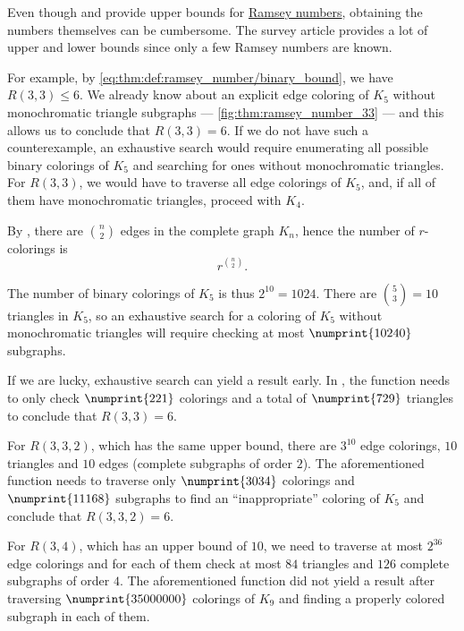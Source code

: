 \begin{remark}\label{rem:estimating_ramsey_numbers}
  Even though  and  provide upper bounds for \hyperref[def:ramsey_number]{Ramsey numbers}, obtaining the numbers themselves can be cumbersome. The survey article \cite{Radziszowski2021} provides a lot of upper and lower bounds since only a few Ramsey numbers are known.

  For example, by \eqref{eq:thm:def:ramsey_number/binary_bound}, we have \( R(3, 3) \leq 6 \). We already know about an explicit edge coloring of \( K_5 \) without monochromatic triangle subgraphs --- \cref{fig:thm:ramsey_number_33} --- and this allows us to conclude that \( R(3, 3) = 6 \). If we do not have such a counterexample, an exhaustive search would require enumerating all possible binary colorings of \( K_5 \) and searching for ones without monochromatic triangles. For \( R(3, 3) \), we would have to traverse all edge colorings of \( K_5 \), and, if all of them have monochromatic triangles, proceed with \( K_4 \).

  By , there are \( \binom n 2 \) edges in the complete graph \( K_n \), hence the number of \( r \)-colorings is
  \begin{equation*}
    r^{\binom n 2}.
  \end{equation*}

  The number of binary colorings of \( K_5 \) is thus \( 2^{10} = 1024 \). There are \( \binom 5 3 = 10 \) triangles in \( K_5 \), so an exhaustive search for a coloring of \( K_5 \) without monochromatic triangles will require checking at most \( \numprint{10 240} \) subgraphs.

  If we are lucky, exhaustive search can yield a result early. In \cite{code}, the function  needs to only check \( \numprint{221} \) colorings and a total of \( \numprint{729} \) triangles to conclude that \( R(3, 3) = 6 \).

  For \( R(3, 3, 2) \), which has the same upper bound, there are \( 3^{10} \) edge colorings, \( 10 \) triangles and \( 10 \) edges (complete subgraphs of order \( 2 \)). The aforementioned function needs to traverse only \( \numprint{3034} \) colorings and \( \numprint{11 168} \) subgraphs to find an \enquote{inappropriate} coloring of \( K_5 \) and conclude that \( R(3, 3, 2) = 6 \).

  For \( R(3, 4) \), which has an upper bound of \( 10 \), we need to traverse at most \( 2^{36} \) edge colorings and for each of them check at most \( 84 \) triangles and \( 126 \) complete subgraphs of order \( 4 \). The aforementioned function did not yield a result after traversing \( \numprint{35 000 000} \) colorings of \( K_9 \) and finding a properly colored subgraph in each of them.


\end{remark}
